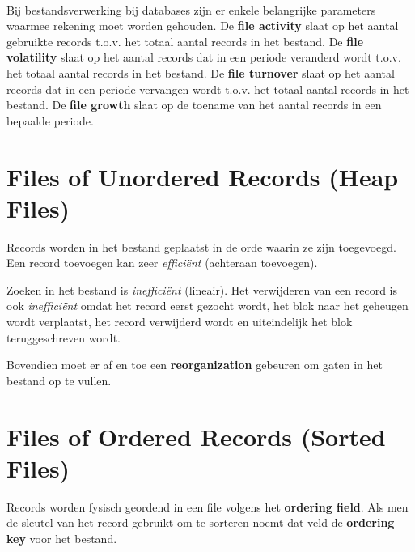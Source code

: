 ~

\noindent Bij bestandsverwerking bij databases zijn er enkele belangrijke parameters waarmee rekening moet worden gehouden. De \textbf{file activity} slaat op het aantal gebruikte records t.o.v. het totaal aantal records in het bestand. De \textbf{file volatility} slaat op het aantal records dat in een periode veranderd wordt t.o.v. het totaal aantal records in het bestand. De \textbf{file turnover} slaat op het aantal records dat in een periode vervangen wordt t.o.v. het totaal aantal records in het bestand. De \textbf{file growth} slaat op de toename van het aantal records in een bepaalde periode.



\section{Files of Unordered Records (Heap Files)}
Records worden in het bestand geplaatst in de orde waarin ze zijn toegevoegd. Een record toevoegen kan zeer \textit{effici\"ent} (achteraan toevoegen).

Zoeken in het bestand is \textit{ineffici\"ent} (lineair). Het verwijderen van een record is ook \textit{ineffici\"ent} omdat het record eerst gezocht wordt, het blok naar het geheugen wordt verplaatst, het record verwijderd wordt en uiteindelijk het blok teruggeschreven wordt.

Bovendien moet er af en toe een \textbf{reorganization} gebeuren om gaten in het bestand op te vullen.



\section{Files of Ordered Records (Sorted Files)}
Records worden fysisch geordend in een file volgens het \textbf{ordering field}. Als men de sleutel van het record gebruikt om te sorteren noemt dat veld de \textbf{ordering key} voor het bestand.

